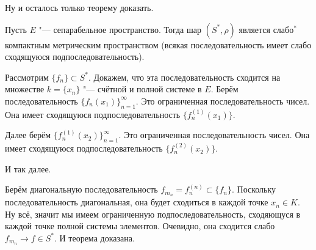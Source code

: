 Ну и осталось только теорему доказать.
\begin{The}
  Пусть $E$ "--- сепарабельное пространство.
  Тогда шар $(S^*,\rho)$ является слабо${}^*$ компактным метрическим пространством (всякая последовательность имеет слабо сходящуюся подпоследовательность).
\end{The}
\begin{Proof}
  Рассмотрим $\{f_n\}\subset S^*$. Докажем, что эта последовательность сходится на множестве $k = \{x_n\}$ "--- счётной и полной системе в $E$.
Берём последовательность $\big\{f_n(x_1)\big\}_{n=1}^\infty$.
Это ограниченная последовательность чисел.
Она имеет сходящуюся подпоследовательность $\big\{f^{(1)}_n(x_1)\big\}$.

Далее берём $\big\{f^{(1)}_n(x_2)\big\}_{n=1}^\infty$.
Это ограниченная последовательность чисел.
Она имеет сходящуюся подпоследовательность $\big\{f^{(2)}_n(x_2)\big\}$.

И так далее.

Берём диагональную последовательность $f_{m_n} = f_n^{(n)}\subset \{f_n\}$. Поскольку последовательность диагональная, она будет сходиться в каждой точке $x_n\in K$. Ну всё, значит мы имеем ограниченную подпоследовательность, сходяющуся в каждой точке полной системы элементов. Очевидно, она сходится слабо $f_{m_n}\to f\in S^*$. И теорема доказана.
\end{Proof}
